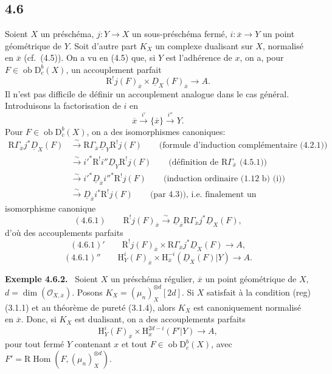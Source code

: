 \documentclass[11pt]{article}
\providecommand{\cO}{\mathcal{O}}
\newenvironment{statement}[1]{\par\medskip\noindent\textbf{#1.}\ }{\par\medskip}
\renewcommand{\H}{\mathrm{H}}
\DeclareMathOperator{\Hom}{Hom}
\newcommand{\R}{\mathrm{R}}
\newcommand{\D}{\mathrm{D}}
\newcommand{\ob}{\operatorname{ob}}
\newcommand{\ol}[1]{\overline{#1}}
\providecommand{\Hom}{\operatorname{Hom}}
\providecommand{\ob}{\operatorname{ob}}
\begin{document}
\subsection*{4.6}
Soient $X$ un préschéma, $j:Y\to X$ un sous-préschéma fermé, $i:\ol{x}\to Y$ un point géométrique de $Y$. Soit d'autre part $K_X$ un complexe dualisant sur $X$, normalisé en $\ol{x}$ (cf.~(4.5)). On a vu en (4.5) que, si $Y$ est l'adhérence de $x$, on a, pour $F\in\ob\D_c^b(X)$, un accouplement parfait
\[
\R^{!}j(F)_{\ol{x}}\times \underline{D}_X(F)_{\ol{x}}\longrightarrow A.
\]
Il n'est pas difficile de définir un accouplement analogue dans le cas général. Introduisons la factorisation de $i$ en
\[
\ol{x}\xrightarrow{i'}\{\ol{x}\}\xrightarrow{i''}Y.
\]
Pour $F\in\ob\D_c^b(X)$, on a des isomorphismes canoniques:
\[
\begin{aligned}
\R\Gamma_{\ol{x}}j^*\underline{D}_X(F)&\xrightarrow{\sim}\R\Gamma_{\ol{x}}\underline{D}_Y\R^{!}j(F)\qquad\text{(formule d'induction complémentaire (4.2.1))}\\
&\xrightarrow{\sim}i'^*\R^{!}i''\underline{D}_Y\R^{!}j(F)\qquad\text{(définition de $\R\Gamma_{\ol{x}}$ (4.5.1))}\\
&\xrightarrow{\sim}i'^*\underline{D}_{\ol{x}}i''^*\R^{!}j(F)\qquad\text{(induction ordinaire (1.12 b) (i))}\\
&\xrightarrow{\sim}\underline{D}_{\ol{x}}i^*\R^{!}j(F)\qquad\text{(par 4.3)), i.e. finalement un}
\end{aligned}
\]
isomorphisme canonique
\[
(4.6.1)\qquad \R^{!}j(F)_{\ol{x}}\xrightarrow{\sim}\underline{D}_{\ol{x}}\R\Gamma_{\ol{x}}j^*\underline{D}_X(F),
\]
d'où des accouplements parfaits
\[
(4.6.1)'\qquad \R^{!}j(F)_{\ol{x}}\times \R\Gamma_{\ol{x}}j^*\underline{D}_X(F)\longrightarrow A,
\]
\[
(4.6.1)''\qquad \H_Y^i(F)_{\ol{x}}\times \H_{\ol{x}}^{-i}(\underline{D}_X(F)|Y)\longrightarrow A.
\]

\begin{statement}{Exemple 4.6.2}
Soient $X$ un préschéma régulier, $\ol{x}$ un point géométrique de $X$, $d=\dim(\cO_{X,\ol{x}})$. Posons $K_X=(\mu_n)_X^{\otimes d}[2d]$. Si $X$ satisfait à la condition (reg) (3.1.1) et au théorème de pureté (3.1.4), alors $K_X$ est canoniquement normalisé en $\ol{x}$. Donc, si $K_X$ est dualisant, on a des accouplements parfaits
\[
\H_Y^i(F)_{\ol{x}}\times \H_{\ol{x}}^{2d-i}(F'|Y)\longrightarrow A,
\]
pour tout fermé $Y$ contenant $x$ et tout $F\in\ob\D_c^b(X)$, avec $F'=\R\Hom(F,(\mu_n)_X^{\otimes d})$.
\end{statement}
\end{document}
